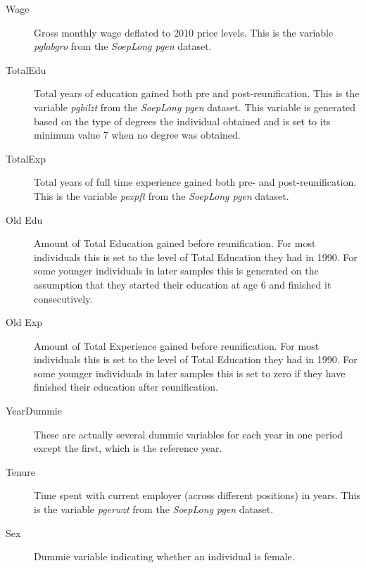 \begin{description}
	\item[Wage] Gross monthly wage deflated to 2010 price levels. This is the variable \textit{pglabgro} from the \textit{SoepLong pgen} dataset. 
	\item[TotalEdu] Total years of education gained both pre and post-reunification. This is the variable \textit{pgbilzt} from the \textit{SoepLong pgen} dataset. This variable is generated based on the type of degrees the individual obtained and is set to its minimum value 7 when no degree was obtained.
	\item[TotalExp] Total years of full time experience gained both pre- and post-reunification. This is the variable \textit{pexpft} from the \textit{SoepLong pgen} dataset.
	\item[Old Edu] Amount of Total Education gained before reunification. For most individuals this is set to the level of Total Education they had in 1990. For some younger individuals in later samples this is generated on the assumption that they started their education at age 6 and finished it consecutively.
	\item[Old Exp] Amount of Total Experience gained before reunification. For most individuals this is set to the level of Total Education they had in 1990. For some younger individuals in later samples this is set to zero if they have finished their education after reunification.
	\item[YearDummie] These are actually several dummie variables for each year in one period except the first, which is the reference year.
	\item[Tenure] Time spent with current employer (across different positions) in years. This is the variable \textit{pgerwzt} from the \textit{SoepLong pgen} dataset.
	\item[Sex] Dummie variable indicating whether an individual is female. 
	 
	
\end{description}
